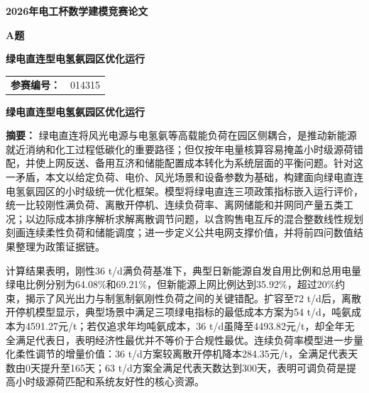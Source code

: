 \documentclass[UTF8,a4paper,12pt]{ctexart}
\begin{document}
\pagestyle{plain}

\begin{titlepage}
  \thispagestyle{empty}
  \centering
  \vspace*{2.0cm}
  {\bfseries 2026年电工杯数学建模竞赛论文\par}
  \vspace{2.0cm}
  {\bfseries A题\par}
  \vspace{0.8cm}
  {\bfseries 绿电直连型电氢氨园区优化运行\par}
  \vfill
  \begin{tabular}{>{\bfseries}rl}
    参赛编号： & 014315 \\
  \end{tabular}
  \vfill
\end{titlepage}

\clearpage
\setcounter{page}{1}
\thispagestyle{plain}

\begin{center}
  {\bfseries 绿电直连型电氢氨园区优化运行\par}
\end{center}

\vspace{0.4em}
\noindent\textbf{摘要：}
绿电直连将风光电源与电氢氨等高载能负荷在园区侧耦合，是推动新能源就近消纳和化工过程低碳化的重要路径；但仅按年电量核算容易掩盖小时级源荷错配，并使上网反送、备用互济和储能配置成本转化为系统层面的平衡问题。针对这一矛盾，本文以给定负荷、电价、风光场景和设备参数为基础，构建面向绿电直连电氢氨园区的小时级统一优化框架。模型将绿电直连三项政策指标嵌入运行评价，统一比较刚性满负荷、离散开停机、连续负荷率、离网储能和并网同产量五类工况；以边际成本排序解析求解离散调节问题，以含购售电互斥的混合整数线性规划刻画连续柔性负荷和储能调度；进一步定义公共电网支撑价值，并将前四问数值结果整理为政策证据链。

计算结果表明，刚性36 t/d满负荷基准下，典型日新能源自发自用比例和总用电量绿电比例分别为64.08\%和69.21\%，但新能源上网比例达到35.92\%，超过20\%约束，揭示了风光出力与制氢制氨刚性负荷之间的关键错配。扩容至72 t/d后，离散开停机模型显示，典型场景中满足三项绿电指标的最低成本方案为54 t/d，吨氨成本为4591.27元/t；若仅追求年均吨氨成本，36 t/d虽降至4493.82元/t，却全年无全满足代表日，表明经济性最优并不等价于合规性最优。连续负荷率模型进一步量化柔性调节的增量价值：36 t/d方案较离散开停机降本284.35元/t，全满足代表天数由0天提升至165天；63 t/d方案全满足代表天数达到300天，表明可调负荷是提高小时级源荷匹配和系统友好性的核心资源。
\end{document}
